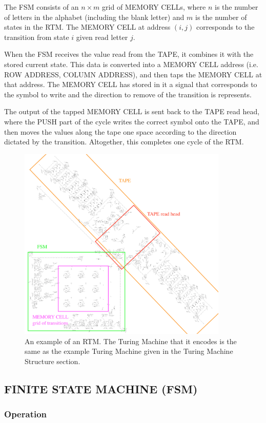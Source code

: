 \documentclass{article}
\begin{document}
The FSM consists of an $  n \times m  $ grid of MEMORY CELLs, where $  n  $ is the number of letters in the alphabet (including the blank letter) and $  m  $ is the number of states in the RTM. The MEMORY CELL at address $  (i,j)  $ corresponds to the transition from state $  i  $ given read letter $  j  $.





When the FSM receives the value read from the TAPE, it combines it with the stored current state. This data is converted into a MEMORY CELL address (i.e. ROW ADDRESS, COLUMN ADDRESS), and then taps the MEMORY CELL at that address. The MEMORY CELL has stored in it a signal that corresponds to the symbol to write and the direction to remove of the transition is represents.





The output of the tapped MEMORY CELL is sent back to the TAPE read head, where the PUSH part of the cycle writes the correct symbol onto the TAPE, and then moves the values along the tape one space according to the direction dictated by the transition. Altogether, this completes one cycle of the RTM.



\begin{figure}[h]
\centering
\includegraphics[width=10cm,keepaspectratio]{images/RTM.png}
\captionsetup{labelformat=empty} \caption{An example of an RTM. The Turing Machine that it encodes is the same as the example Turing Machine given in the Turing Machine Structure section.}
\end{figure}
\subsection{FINITE STATE MACHINE (FSM)}\subsubsection{Operation}
\end{document}

